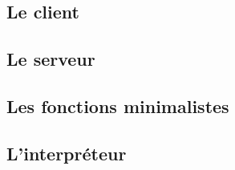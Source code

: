 \documentclass[a4paper, 11pt]{article}
\begin{document}
\newpage
\subsection{Le client}
%

\newpage
\subsection{Le serveur}
%

\newpage
\subsection{Les fonctions minimalistes}
%

\newpage
\subsection{L'interpréteur}
%
\end{document}
